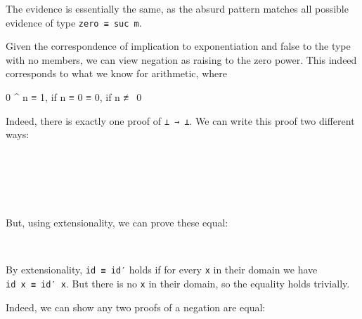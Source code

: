 The evidence is essentially the same, as the absurd pattern matches all
possible evidence of type \texttt{zero\ ≡\ suc\ m}.

Given the correspondence of implication to exponentiation and false to
the type with no members, we can view negation as raising to the zero
power. This indeed corresponds to what we know for arithmetic, where

\begin{myDisplay}
0 ^ n  ≡  1,  if n ≡ 0
       ≡  0,  if n ≢ 0
\end{myDisplay}

Indeed, there is exactly one proof of \texttt{⊥\ →\ ⊥}. We can write
this proof two different ways:

\begin{fence}
\begin{code}%
\>[0]\AgdaSpace{}%
\AgdaSymbol{:}\AgdaSpace{}%
\AgdaSpace{}%
\AgdaSpace{}%
\<%
\\
\>[0]\AgdaSpace{}%
\AgdaSpace{}%
\AgdaSymbol{=}\AgdaSpace{}%
\<%
\\
%
\\[\AgdaEmptyExtraSkip]%
\>[0]\AgdaSpace{}%
\AgdaSymbol{:}\AgdaSpace{}%
\AgdaSpace{}%
\AgdaSpace{}%
\<%
\\
\>[0]\AgdaSpace{}%
\AgdaSymbol{()}\<%
\end{code}
\end{fence}

But, using extensionality, we can prove these equal:

\begin{fence}
\begin{code}%
\>[0]\AgdaSpace{}%
\AgdaSymbol{:}\AgdaSpace{}%
\AgdaSpace{}%
\AgdaSpace{}%
\<%
\\
\>[0]\AgdaSpace{}%
\AgdaSymbol{=}\AgdaSpace{}%
\AgdaSpace{}%
\<%
\end{code}
\end{fence}

By extensionality, \texttt{id\ ≡\ id′} holds if for every \texttt{x} in
their domain we have \texttt{id\ x\ ≡\ id′\ x}. But there is no
\texttt{x} in their domain, so the equality holds trivially.

Indeed, we can show any two proofs of a negation are equal:

